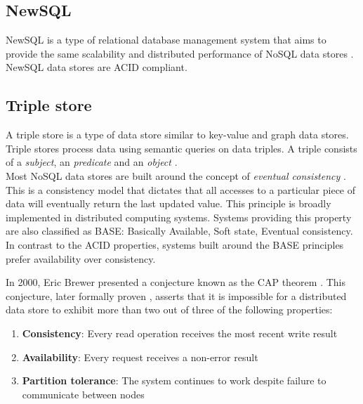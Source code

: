 \subsection{NewSQL}
\label{subsec:newsql}

NewSQL is a type of relational database management system that aims to provide the same scalability and distributed performance of NoSQL data stores \autocite{Grolinger2013}.
NewSQL data stores are ACID compliant.

\subsection{Triple store}
\label{subsec:triple-store}

A triple store is a type of data store similar to key-value and graph data stores.
Triple stores process data using semantic queries on data triples.
A triple consists of a \textit{subject}, an \textit{predicate} and an \textit{object} \autocite{Rohloff2007}.
\\

Most NoSQL data stores are built around the concept of \textit{eventual consistency} \autocite{Brewer2000}.
This is a consistency model that dictates that all accesses to a particular piece of data will eventually return the last updated value.
This principle is broadly implemented in distributed computing systems.
Systems providing this property are also classified as BASE: Basically Available, Soft state, Eventual consistency.
In contrast to the ACID properties, systems built around the BASE principles prefer availability over consistency.

In 2000, Eric Brewer presented a conjecture known as the CAP theorem \autocite{Brewer2000}.
This conjecture, later formally proven \autocite{GilbertLynch2002}, asserts that it is impossible for a distributed data store to exhibit more than two out of three of the following properties:

\begin{enumerate}
  \item \textbf{Consistency}: Every read operation receives the most recent write result
  \item \textbf{Availability}: Every request receives a non-error result
  \item \textbf{Partition tolerance}: The system continues to work despite failure to communicate between nodes
\end{enumerate}

